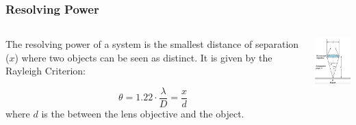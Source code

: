 \documentclass{beamer}
\begin{document}
\begin{frame}\frametitle{Resolving Power}
\begin{columns}
\begin{column}{7cm}
The resolving power of a system is the smallest distance of separation ($x$) where two objects can be seen as distinct. It is given by the Rayleigh Criterion:

\[\theta = 1.22 \cdot \frac{\lambda}{D} = \frac{x}{d}\]
where $d$ is the between the lens objective and the object.

\end{column}
\begin{column}{4cm}
\begin{center}
\includegraphics[width=3cm]{fig/rayleigh3.jpg}
\end{center}
\end{column}
\end{columns}
\end{frame}
\end{document}
